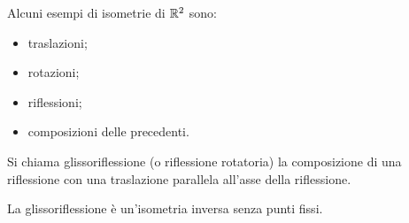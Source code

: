  Alcuni esempi di isometrie di $\mathbb R^2$ sono:
 \begin{itemize}
	\item traslazioni;
	\item rotazioni;
	\item riflessioni;
	\item composizioni delle precedenti.
 \end{itemize}
 
 \begin{definition}
 Si chiama glissoriflessione (o riflessione rotatoria) la composizione di una riflessione con una traslazione parallela
 all'asse della riflessione.
 \end{definition}
 
 \begin{remark}
 La glissoriflessione è un'isometria inversa senza punti fissi.
 \end{remark}
 
